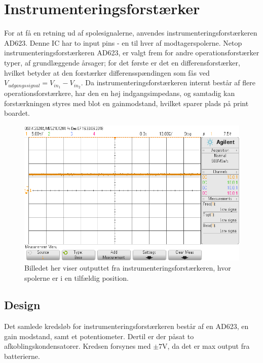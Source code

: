 \section{Instrumenteringsforstærker}\label{sec:summa}
For at få en retning ud af spolesignalerne, anvendes instrumenteringsforstærkeren AD623. Denne IC har to input pins - en til hver af modtagerspolerne.
Netop instrumenteringsforstærkeren AD623, er valgt frem for andre operationsforstærker typer, af grundlæggende årsager; for det første er det en differensforstærker, hvilket betyder at den forstærker differensspændingen som fås ved $V_{udgangssignal} = V_{in_1} - V_{in_2}$. Da instrumenteringsforstærkeren internt består af flere operationsforstærkere, har den en høj indgangsimpedans, og samtadig kan forstærkningen styres med blot en gainmodstand, hvilket sparer plads på print boardet.

\begin{figure}[h!]
	\centering
	\includegraphics[width=1\textwidth]{billeder/instr_png.png}
	\caption{Billedet her viser outputtet fra instrumenteringsforstærkeren, hvor spolerne er i en tilfældig position.}
	\label{fig:filter_out}
\end{figure}

\subsection{Design}
Det samlede kredsløb for instrumenteringsforstærkeren består af en AD623, en gain modstand, samt et potentiometer. Dertil er der påsat to afkoblingskondensatorer. Kredsen forsynes med $\pm 7 \si{\volt}$, da det er max output fra batterierne. 


